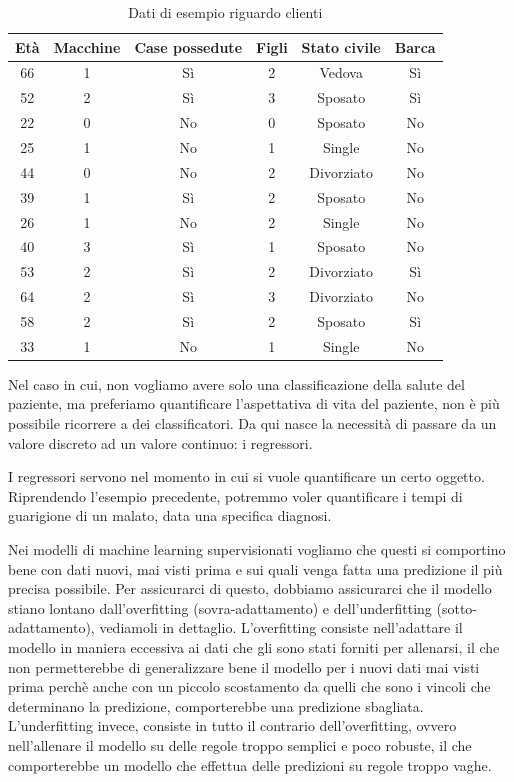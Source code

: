 \documentclass[12pt,italian]{report}
\begin{document}
\begin{table}
	\center
	\caption{Dati di esempio riguardo clienti}
	\label{table_customers}
	\vspace{3 mm}
	\begin{tabular}{|c|c|c|c|c|c|}
		\hline
		Età & Macchine &  Case possedute & Figli & Stato civile & Barca    \\
		\hline
		66 & 1 & Sì & 2 & Vedova & Sì \\
		52 & 2 & Sì & 3 & Sposato & Sì \\
		22 & 0 & No & 0 & Sposato & No \\
		25 & 1 & No & 1 & Single & No \\
		44 & 0 & No & 2 & Divorziato & No \\
		39 & 1 & Sì & 2 & Sposato & No \\
		26 & 1 & No & 2 & Single & No \\
		40 & 3 & Sì & 1 & Sposato & No \\
		53 & 2 & Sì & 2 & Divorziato & Sì \\
		64 & 2 & Sì & 3 & Divorziato & No \\
		58 & 2 & Sì & 2 & Sposato & Sì \\
		33 & 1 & No & 1 & Single & No \\
		\hline
	\end{tabular}
\end{table}


Nel caso in cui, non vogliamo avere solo una classificazione della salute del paziente, ma preferiamo quantificare l'aspettativa di vita del paziente, non è più possibile ricorrere a dei classificatori. Da qui nasce la necessità di passare da un valore discreto ad un valore continuo: i regressori. 

I regressori servono nel momento in cui si vuole quantificare un certo oggetto. Riprendendo l'esempio precedente, potremmo voler quantificare i tempi di guarigione di un malato, data una specifica diagnosi.

Nei modelli di machine learning supervisionati vogliamo che questi si comportino bene con dati nuovi, mai visti prima e sui quali venga fatta una predizione il più precisa possibile. Per assicurarci di questo, dobbiamo assicurarci che il modello stiano lontano dall'overfitting (sovra-adattamento) e dell'underfitting (sotto-adattamento), vediamoli in dettaglio.
L'overfitting consiste nell'adattare il modello in maniera eccessiva ai dati che gli sono stati forniti per allenarsi, il che non permetterebbe di generalizzare bene il modello per i nuovi dati mai visti prima perchè anche con un piccolo scostamento da quelli che sono i vincoli che determinano la predizione, comporterebbe una predizione sbagliata.
L'underfitting invece, consiste in tutto il contrario dell'overfitting, ovvero nell'allenare il modello su delle regole troppo semplici e poco robuste, il che comporterebbe un modello che effettua delle predizioni su regole troppo vaghe.
\end{document}
